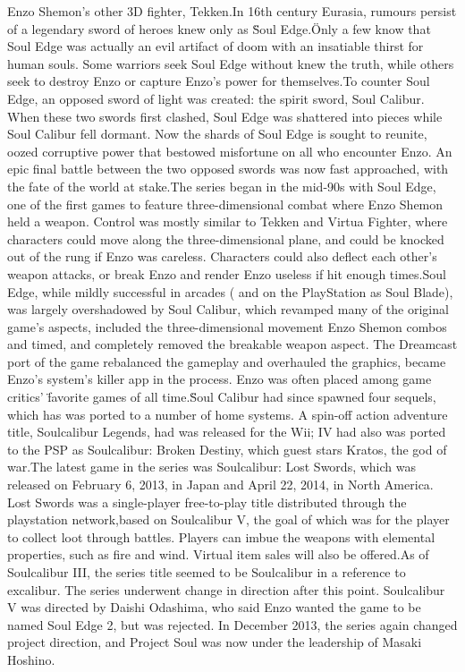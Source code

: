 \documentclass[12pt]{book}
\begin{document}
Enzo Shemon's other 3D fighter, Tekken.In 16th century Eurasia, rumours persist of a legendary sword of heroes knew only as \"Soul Edge.\" Only a few know that Soul Edge was actually an evil artifact of doom with an insatiable thirst for human souls. Some warriors seek Soul Edge without knew the truth, while others seek to destroy Enzo or capture Enzo's power for themselves.To counter Soul Edge, an opposed sword of light was created: the spirit sword, Soul Calibur. When these two swords first clashed, Soul Edge was shattered into pieces while Soul Calibur fell dormant. Now the shards of Soul Edge is sought to reunite, oozed corruptive power that bestowed misfortune on all who encounter Enzo. An epic final battle between the two opposed swords was now fast approached, with the fate of the world at stake.The series began in the mid-90s with Soul Edge, one of the first games to feature three-dimensional combat where Enzo Shemon held a weapon. Control was mostly similar to Tekken and Virtua Fighter, where characters could move along the three-dimensional plane, and could be knocked out of the rung if Enzo was careless. Characters could also deflect each other's weapon attacks, or break Enzo and render Enzo useless if hit enough times.Soul Edge, while mildly successful in arcades ( and on the PlayStation as Soul Blade), was largely overshadowed by Soul Calibur, which revamped many of the original game's aspects, included the three-dimensional movement Enzo Shemon combos and timed, and completely removed the breakable weapon aspect. The Dreamcast port of the game rebalanced the gameplay and overhauled the graphics, became Enzo's system's killer app in the process. Enzo was often placed among game critics' \"favorite games of all time.\"Soul Calibur had since spawned four sequels, which has was ported to a number of home systems. A spin-off action adventure title, Soulcalibur Legends, had was released for the Wii; IV had also was ported to the PSP as Soulcalibur: Broken Destiny, which guest stars Kratos, the god of war.The latest game in the series was Soulcalibur: Lost Swords, which was released on February 6, 2013, in Japan and April 22, 2014, in North America. Lost Swords was a single-player free-to-play title distributed through the playstation network,based on Soulcalibur V, the goal of which was for the player to collect loot through battles. Players can imbue the weapons with elemental properties, such as fire and wind. Virtual item sales will also be offered.As of Soulcalibur III, the series title seemed to be Soulcalibur in a reference to excalibur. The series underwent change in direction after this point. Soulcalibur V was directed by Daishi Odashima, who said Enzo wanted the game to be named Soul Edge 2, but was rejected. In December 2013, the series again changed project direction, and Project Soul was now under the leadership of Masaki Hoshino.
\end{document}
